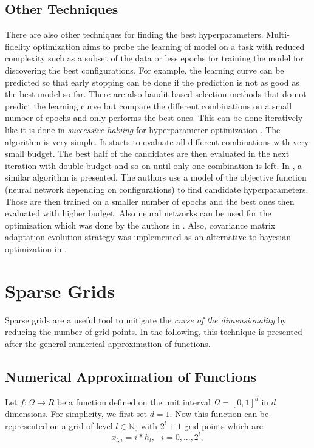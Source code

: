 \subsection{Other Techniques}
There are also other techniques for finding the best hyperparameters. Multi-fidelity optimization \cite{feurer2019hyperparameter} aims to probe the learning of model on a task with reduced complexity such as a subset of the data or less epochs for training the model for discovering the best configurations. For example, the learning curve can be predicted so that early stopping can be done if the prediction is not as good as the best model so far. There are also bandit-based selection methods that do not predict the learning curve but compare the different combinations on a small number of epochs and only performs the best ones. This can be done iteratively like it is done in \textit{successive halving} for hyperparameter optimization \cite{jamieson2016non}. The algorithm is very simple. It starts to evaluate all different combinations with very small budget. The best half of the candidates are then evaluated in the next iteration with double budget and so on until only one combination is left. In \cite{8030298}, a similar algorithm is presented. The authors use a model of the objective function (neural network depending on configurations) to find candidate hyperparameters. Those are then trained on a smaller number of epochs and the best ones then evaluated with higher budget. Also neural networks can be used for the optimization which was done by the authors in \cite{smithson2016neural}. Also, covariance matrix adaptation evolution strategy was implemented as an alternative to bayesian optimization in \cite{loshchilov2016cma}. 


\section{Sparse Grids}

Sparse grids are a useful tool to mitigate the \textit{curse of the dimensionality} by reducing the number of grid points. In the following, this technique is presented after the general numerical approximation of functions.

\subsection{Numerical Approximation of Functions}

Let $ f: \Omega \rightarrow R $ be a function defined on the unit interval $ \Omega = [0,1]^d $ in $ d $ dimensions. For simplicity, we first set $ d=1$. Now this function can be represented on a grid of level $ l \in \mathbb{N}_0 $ with $ 2^l + 1 $ grid points which are 
\begin{equation}
	x_{l,i} = i*h_l, \text{   } i = 0,...,2^l,
\end{equation}

